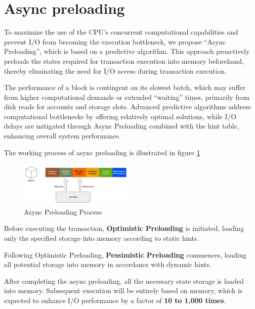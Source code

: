 
\section{Async preloading}

To maximize the use of the CPU's concurrent computational capabilities and prevent I/O from becoming the execution bottleneck, we propose ``Async Preloading'', which is based on a predictive algorithm. This approach proactively preloads the states required for transaction execution into memory beforehand, thereby eliminating the need for I/O access during transaction execution.

The performance of a block is contingent on its slowest batch, which may suffer from higher computational demands or extended ``waiting'' times, primarily from disk reads for accounts and storage slots. Advanced predictive algorithms address computational bottlenecks by offering relatively optimal solutions, while I/O delays are mitigated through Async Preloading combined with the hint table, enhancing overall system performance.

The working process of async preloading is illustrated in figure \ref{fig:async_preloading}

\newpage

\begin{figure}[htp]
  \centering
  \includegraphics[width=0.5\textwidth]{sections/images/async-preloading.png}
  \caption{Async Preloading Process}
  \label{fig:async_preloading}
\end{figure}

Before executing the transaction, \textbf{Optimistic Preloading} is initiated, loading only the specified storage into memory according to static hints.

Following Optimistic Preloading, \textbf{Pessimistic Preloading} commences, loading all potential storage into memory in accordance with dynamic hints.

After completing the async preloading, all the necessary state storage is loaded into memory. Subsequent execution will be entirely based on memory, which is expected to enhance I/O performance by a factor of \textbf{10 to 1,000 times}.

